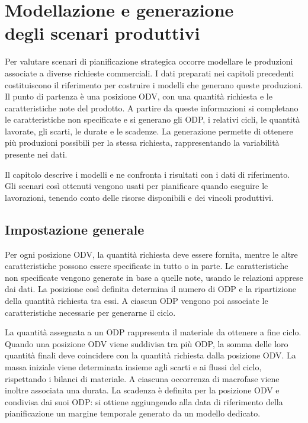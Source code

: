 \chapter[Modellazione e generazione degli scenari produttivi]{Modellazione e generazione\\degli scenari produttivi}
\label{sec:modelling-and-production-scenarios}

Per valutare scenari di pianificazione strategica occorre modellare le produzioni associate a diverse richieste commerciali. I dati preparati nei capitoli precedenti costituiscono il riferimento per costruire i modelli che generano queste produzioni. Il punto di partenza è una posizione ODV, con una quantità richiesta e le caratteristiche note del prodotto. A partire da queste informazioni si completano le caratteristiche non specificate e si generano gli ODP, i relativi cicli, le quantità lavorate, gli scarti, le durate e le scadenze. La generazione permette di ottenere più produzioni possibili per la stessa richiesta, rappresentando la variabilità presente nei dati.

Il capitolo descrive i modelli e ne confronta i risultati con i dati di riferimento. Gli scenari così ottenuti vengono usati per pianificare quando eseguire le lavorazioni, tenendo conto delle risorse disponibili e dei vincoli produttivi.

\section{Impostazione generale}
\label{sec:modelling-overview}

Per ogni posizione ODV, la quantità richiesta deve essere fornita, mentre le altre caratteristiche possono essere specificate in tutto o in parte. Le caratteristiche non specificate vengono generate in base a quelle note, usando le relazioni apprese dai dati. La posizione così definita determina il numero di ODP e la ripartizione della quantità richiesta tra essi. A ciascun ODP vengono poi associate le caratteristiche necessarie per generarne il ciclo.

La quantità assegnata a un ODP rappresenta il materiale da ottenere a fine ciclo. Quando una posizione ODV viene suddivisa tra più ODP, la somma delle loro quantità finali deve coincidere con la quantità richiesta dalla posizione ODV. La massa iniziale viene determinata insieme agli scarti e ai flussi del ciclo, rispettando i bilanci di materiale. A ciascuna occorrenza di macrofase viene inoltre associata una durata. La scadenza è definita per la posizione ODV e condivisa dai suoi ODP: si ottiene aggiungendo alla data di riferimento della pianificazione un margine temporale generato da un modello dedicato.

